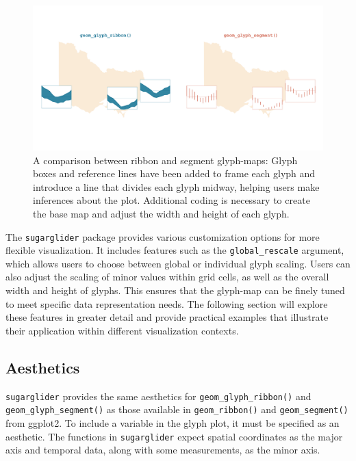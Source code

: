 \begin{figure}
\includegraphics[width=50in]{figures/ribbon_segment} \caption{A comparison between ribbon and segment glyph-maps: Glyph boxes and reference lines have been added to frame each glyph and introduce a line that divides each glyph midway, helping users make inferences about the plot. Additional coding is necessary to create the base map and adjust the width and height of each glyph.}\label{fig:comparisonPlot}
\end{figure}

The \texttt{sugarglider} package provides various customization options for more flexible visualization. It includes features such as the \texttt{global\_rescale} argument, which allows users to choose between global or individual glyph scaling. Users can also adjust the scaling of minor values within grid cells, as well as the overall width and height of glyphs. This ensures that the glyph-map can be finely tuned to meet specific data representation needs. The following section will explore these features in greater detail and provide practical examples that illustrate their application within different visualization contexts.

\subsection{Aesthetics}\label{aesthetics}

\texttt{sugarglider} provides the same aesthetics for \texttt{geom\_glyph\_ribbon()} and \texttt{geom\_glyph\_segment()} as those available in \texttt{geom\_ribbon()} and \texttt{geom\_segment()} from ggplot2. To include a variable in the glyph plot, it must be specified as an aesthetic. The functions in \texttt{sugarglider} expect spatial coordinates as the major axis and temporal data, along with some measurements, as the minor axis.

